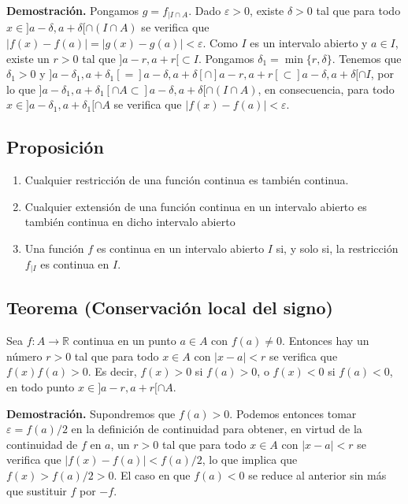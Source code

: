 \documentclass[10pt,a4paper]{article}
\begin{document}
	\textbf{Demostración. }Pongamos $g = f_{|I \cap A}$. Dado $\varepsilon > 0$, existe $\delta > 0$ tal que para todo $x \in ]a - \delta, a + \delta[ \cap (I \cap A)$ se verifica que $|f(x) - f(a)| = |g(x) - g(a)| < \varepsilon$. Como $I$ es un intervalo abierto y $a \in I$, existe un $r > 0$ tal que $]a - r, a + r[ \subset I$. Pongamos $\delta_1 = \min\{r, \delta\}$. Tenemos que $\delta_1 > 0$ y $]a - \delta_1, a + \delta_1[ = ]a - \delta, a + \delta[ \cap ]a-r, a+r [ \subset ]a-\delta, a+\delta[ \cap I$, por lo que $]a - \delta_1, a + \delta_1[ \cap A \subset ]a - \delta, a + \delta[ \cap (I \cap A)$, en consecuencia, para todo $x \in ]a-\delta_1, a + \delta_1[ \cap A$ se verifica que $|f(x) - f(a)| < \varepsilon$.
	
	\subsection{Proposición}
	\begin{enumerate}[label = \alph*)]
		\item Cualquier restricción de una función continua es también continua.
		\item Cualquier extensión de una función continua en un intervalo abierto es también continua en dicho intervalo abierto
		\item Una función $f$ es continua en un intervalo abierto $I$ si, y solo si, la restricción $f_{|I}$ es continua en $I$.
	\end{enumerate}
	
	\subsection{Teorema (Conservación local del signo)}
	Sea $f : A \rightarrow \mathbb{R}$ continua en un punto $a \in A$ con $f(a) \neq 0$. Entonces hay un número $r > 0$ tal que para todo $x \in A$ con $|x -a| < r$ se verifica que $f(x)f(a) > 0$. Es decir, $f(x) > 0$ si $f(a) > 0$, o $f(x) < 0$ si $f(a) < 0$, en todo punto $x \in ]a - r, a + r[ \cap A$.
	
	\textbf{Demostración. }Supondremos que $f(a) > 0$. Podemos entonces tomar $\varepsilon = f(a) / 2$ en la definición de continuidad para obtener, en virtud de la continuidad de $f$ en $a$, un $r > 0$ tal que para todo $x \in A$ con $|x - a| < r$ se verifica que $|f(x) - f(a)| < f(a) / 2$, lo que implica que $f(x) > f(a)/2 > 0$. El caso en que $f(a) < 0$ se reduce al anterior sin más que sustituir $f$ por $-f$.
	
	\newpage
	
\end{document}
